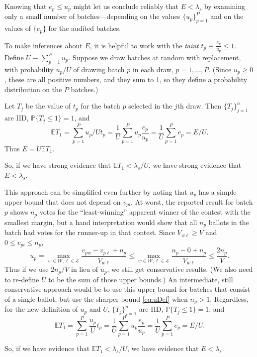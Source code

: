 Knowing that $e_p \le u_p$ might let us conclude reliably that $E < \lambda_s$
by examining only a small number of batches---depending on the 
values $\{ u_p\}_{p=1}^P$ and on the values of $\{e_p\}$ for the audited batches.

To make inferences about $E$, it is helpful to work with the \emph{taint} 
$t_p \equiv \frac{e_p}{u_p} \le 1$.
Define $U \equiv \sum_{p=1}^P u_p$.
Suppose we draw batches at random with replacement, with probability $u_p/U$
of drawing batch $p$ in each draw, $p = 1, \ldots, P$.
(Since $u_p \ge 0$, these are all positive numbers, and they sum to 1,
so they define a probability distribution on the $P$ batches.)

Let $T_j$ be the value of $t_p$ for the batch $p$ selected in the $j$th draw.
Then $\{T_j\}_{j=1}^n$ are IID, $\mathbb{P} \{T_j \le 1\} = 1$, and
$$
  \mathbb{E} T_1 = \sum_{p=1}^P u_p/U t_p =
  \frac{1}{U}\sum_{p=1}^P u_p \frac{e_p}{u_p} = 
  \frac{1}{U} \sum_{p=1}^P e_p = E/U.
$$
Thus $E = U \mathbb{E} T_1$. 

So, if we have strong evidence that
$\mathbb{E} T_1 < \lambda_s/U$, we have
strong evidence that $E < \lambda_s$.

This approach can be simplified even further by noting that $u_p$ has
a simple upper bound that does not depend on $v_{pi}$.
At worst, the reported result for batch $p$ shows $n_p$ votes for the 
``least-winning'' apparent winner of the contest with the smallest margin, 
but a hand interpretation would show that all $n_p$ ballots in the batch 
had votes for the runner-up in that contest.
Since $V_{w\ell} \ge V$ and $0 \le v_{pi} \le n_p$,
$$ 
    u_p =  \max_{w \in \mathcal{W}, \ell \in \mathcal{L}} 
    \frac{v_{pw} - v_{p\ell} + n_p}{V_{w\ell}}
    \le  \max_{w \in \mathcal{W}, \ell \in \mathcal{L}} 
    \frac{n_p - 0 + n_p}{V_{w\ell}}
    \le \frac{2n_p}{V}.
$$
Thus if we use $2n_p/V$ in lieu of $u_p$, we still get conservative results.
(We also need to re-define $U$ to be the sum of those upper bounds.)
An intermediate, still conservative approach would be to use this upper bound for
batches that consist of a single ballot, but use the sharper bound \ref{eq:uDef}
when $n_p > 1$.
Regardless, for the new definition of $u_p$ and $U$,
$\{T_j\}_{j=1}^n$ are IID, $\mathbb{P} \{T_j \le 1\} = 1$,
and
$$
  \mathbb{E} T_1 = \sum_{p=1}^P \frac{u_p}{U} t_p =
  \frac{1}{U}\sum_{p=1}^P u_p \frac{e_p}{u_p} = 
  \frac{1}{U} \sum_{p=1}^P e_p = E/U.
$$

So, if we have evidence that $\mathbb{E} T_1 < \lambda_s/U$, we have evidence that 
$E < \lambda_s$.

